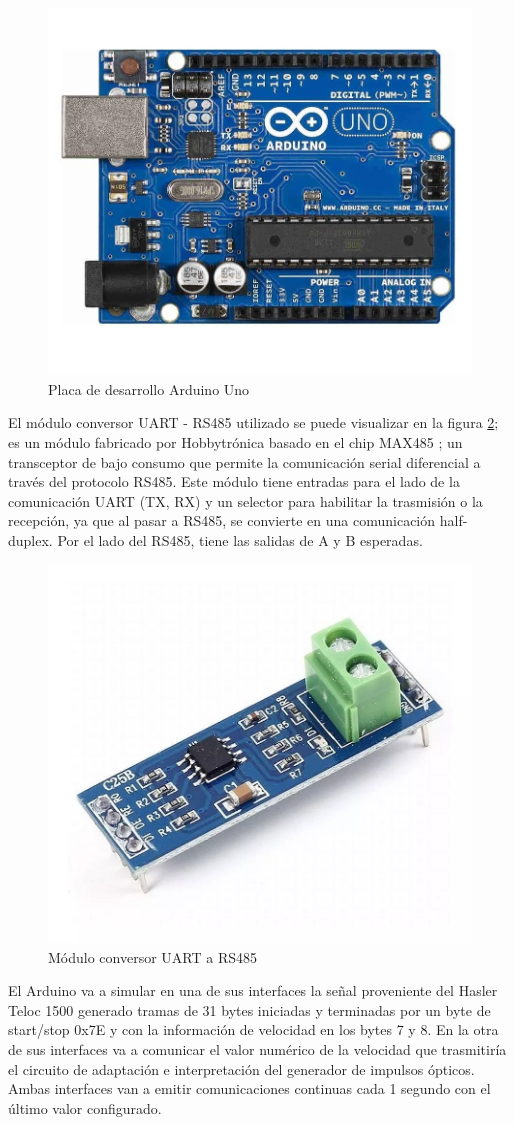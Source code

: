 \begin{figure}[H]
    \centering
    \includegraphics[width = 0.6 \linewidth]{img/arduino_uno.png}
    \caption{Placa de desarrollo Arduino Uno}
    \label{fig:arduino_uno}
\end{figure}


El módulo conversor UART - RS485 utilizado se puede visualizar en la figura \ref{fig:conversor_uart_rs485}; es un módulo fabricado por Hobbytrónica \cite{hobbytronica} basado en el chip MAX485 \cite{max485}; un transceptor de bajo consumo que permite la comunicación serial diferencial a través del protocolo RS485. Este módulo tiene entradas para el lado de la comunicación UART (TX, RX) y un selector para habilitar la trasmisión o la recepción, ya que al pasar a RS485, se convierte en una comunicación half-duplex. Por el lado del RS485, tiene las salidas de A y B esperadas. 


\begin{figure}[H]
    \centering
    \includegraphics[width = 0.5\linewidth]{img/conversor_uart_rs485.png}
    \caption{Módulo conversor UART a RS485}
    \label{fig:conversor_uart_rs485}
\end{figure}

El Arduino va a simular en una de sus interfaces la señal proveniente del Hasler Teloc 1500 generado tramas de 31 bytes iniciadas y terminadas por un byte de start/stop 0x7E y con la información de velocidad en los bytes 7 y 8. En la otra de sus interfaces va a comunicar el valor numérico de la velocidad que trasmitiría el circuito de adaptación e interpretación del generador de impulsos ópticos. Ambas interfaces van a emitir comunicaciones continuas cada 1 segundo con el último valor configurado. \\ 

